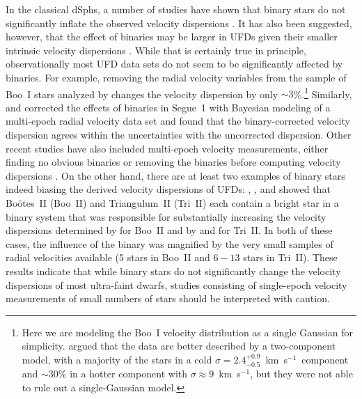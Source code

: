 \documentclass[a4paper]{ar-1col}
\newcommand{\kms}         {km~s$^{-1}$}
\begin{document}
In the classical dSphs, a number of studies have shown that binary
stars do not significantly inflate the observed velocity dispersions
\citep[e.g.,][]{olszewski95,olszewski96,vogt95,hargreaves96,kleyna02,minor10,spencer17}.
It has also been suggested, however, that the effect of binaries may
be larger in UFDs given their smaller intrinsic velocity dispersions
\citep{mc10,spencer17}.  While that is certainly true in principle,
observationally most UFD data sets do not seem to be significantly
affected by binaries.  For example, removing the radial velocity
variables from the sample of Boo~I stars analyzed by \citet{koposov11}
changes the velocity dispersion by only $\sim3$\%.\footnote{Here we
  are modeling the Boo~I velocity distribution as a single Gaussian
  for simplicity.  \citet{koposov11} argued that the data are better
  described by a two-component model, with a majority of the stars in
  a cold $\sigma = 2.4^{+0.9}_{-0.5}$~\kms\ component and $\sim30$\%
  in a hotter component with $\sigma \approx 9$~\kms, but they were
  not able to rule out a single-Gaussian model.}  Similarly,
\citet{martinez11} and \citet{simon11} corrected the effects of
binaries in Segue~1 with Bayesian modeling of a multi-epoch radial
velocity data set and found that the binary-corrected velocity
dispersion agrees within the uncertainties with the uncorrected
dispersion.  Other recent studies have also included multi-epoch
velocity measurements, either finding no obvious binaries
\citep{simon17} or removing the binaries before computing velocity
dispersions \citep{li18}.  On the other hand, there are at least two
examples of binary stars indeed biasing the derived velocity
dispersions of UFDs: \citet{ji16b}, \citet{venn17}, and
\citet{kirby17} showed that Bo{\"o}tes~II (Boo~II) and Triangulum~II
(Tri~II) each contain a bright star in a binary system that was
responsible for substantially increasing the velocity dispersions
determined by \citet{koch09} for Boo~II and by \citet{martin16a} and
\citet{kirby15b} for Tri~II.  In both of these cases, the influence of
the binary was magnified by the very small samples of radial
velocities available (5 stars in Boo~II and $6-13$ stars in Tri~II).
These results indicate that while binary stars do not significantly
change the velocity dispersions of most ultra-faint dwarfs, studies
consisting of single-epoch velocity measurements of small numbers of
stars should be interpreted with caution.
\end{document}
